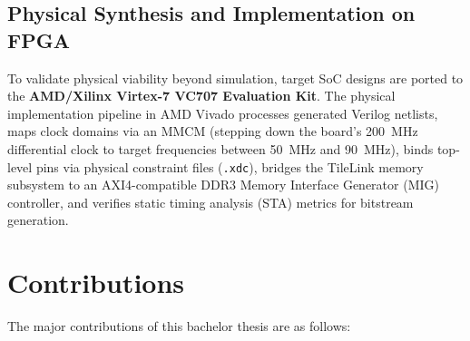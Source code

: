 \subsection{Physical Synthesis and Implementation on FPGA}
To validate physical viability beyond simulation, target SoC designs are ported to the \textbf{AMD/Xilinx Virtex-7 VC707 Evaluation Kit}. 
The physical implementation pipeline in AMD Vivado processes generated Verilog netlists, 
maps clock domains via an MMCM (stepping down the board's 200~MHz differential clock to target frequencies between 50~MHz and 90~MHz), 
binds top-level pins via physical constraint files (\texttt{.xdc}), bridges the TileLink memory subsystem to an AXI4-compatible DDR3 Memory Interface Generator (MIG) controller, 
and verifies static timing analysis (STA) metrics for bitstream generation.

\section{Contributions}
\label{sec:contributions}

The major contributions of this bachelor thesis are as follows:

